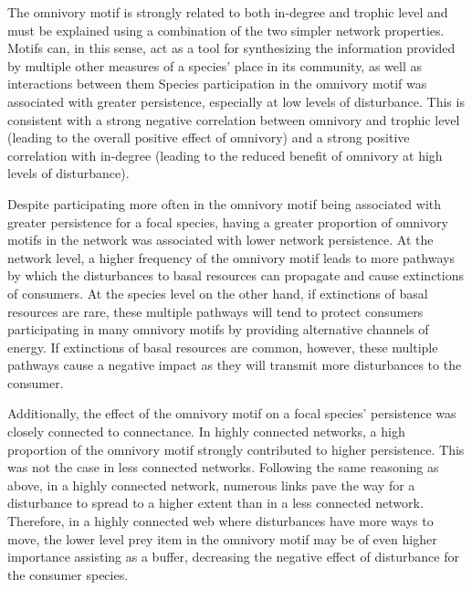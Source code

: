 \documentclass[12pt]{article}
\begin{document}
\begin{spacing}{2.0}
The omnivory motif is strongly related to both in-degree and trophic level and must be explained using a combination of the two simpler network properties.
Motifs can, in this sense, act as a tool for synthesizing the information provided by multiple other measures of a species' place in its community, as well as interactions between them
Species participation in the omnivory motif was associated with greater persistence, especially at low levels of disturbance.
This is consistent with a strong negative correlation between omnivory and trophic level (leading to the overall positive effect of omnivory) and a strong positive correlation with in-degree (leading to the reduced benefit of omnivory at high levels of disturbance). 


Despite participating more often in the omnivory motif being associated with greater persistence for a focal species, having a greater proportion of omnivory motifs in the network was associated with lower network persistence.
At the network level, a higher frequency of the omnivory motif leads to more pathways by which the disturbances to basal resources can propagate and cause extinctions of consumers.
At the species level on the other hand, if extinctions of basal resources are rare, these multiple pathways will tend to protect consumers participating in many omnivory motifs by providing alternative channels of energy.
If extinctions of basal resources are common, however, these multiple pathways cause a negative impact as they will transmit more disturbances to the consumer.

Additionally, the effect of the omnivory motif on a focal species' persistence was closely connected to connectance. In highly connected networks, a high proportion of the omnivory motif strongly contributed to higher persistence. This was not the case in less connected networks. 
Following the same reasoning as above, in a highly connected network, numerous links pave the way for a disturbance to spread to a higher extent than in a less connected network. 
Therefore, in a highly connected web where disturbances have more ways to move, the lower level prey item in the omnivory motif may be of even higher importance assisting as a buffer, decreasing the negative effect of disturbance for the consumer species.



\end{spacing}
\end{document}

